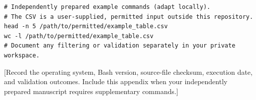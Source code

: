 \documentclass[12pt,letterpaper]{article}
\begin{document}
\begin{singlespace}
\begin{lstlisting}
# Independently prepared example commands (adapt locally).
# The CSV is a user-supplied, permitted input outside this repository.
head -n 5 /path/to/permitted/example_table.csv
wc -l /path/to/permitted/example_table.csv
# Document any filtering or validation separately in your private workspace.
\end{lstlisting}
\end{singlespace}

[Record the operating system, Bash version, source-file checksum, execution
date, and validation outcomes. Include this appendix when your independently prepared manuscript
requires supplementary commands.]
\end{document}
